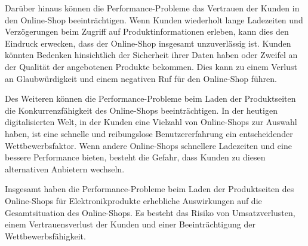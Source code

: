Darüber hinaus können die Performance-Probleme das Vertrauen der Kunden in den Online-Shop beeinträchtigen. Wenn Kunden wiederholt lange Ladezeiten und Verzögerungen beim Zugriff auf Produktinformationen erleben, kann dies den Eindruck erwecken, dass der Online-Shop insgesamt unzuverlässig ist. Kunden könnten Bedenken hinsichtlich der Sicherheit ihrer Daten haben oder Zweifel an der Qualität der angebotenen Produkte bekommen. Dies kann zu einem Verlust an Glaubwürdigkeit und einem negativen Ruf für den Online-Shop führen.

Des Weiteren können die Performance-Probleme beim Laden der Produktseiten die Konkurrenzfähigkeit des Online-Shops beeinträchtigen. In der heutigen digitalisierten Welt, in der Kunden eine Vielzahl von Online-Shops zur Auswahl haben, ist eine schnelle und reibungslose Benutzererfahrung ein entscheidender Wettbewerbsfaktor. Wenn andere Online-Shops schnellere Ladezeiten und eine bessere Performance bieten, besteht die Gefahr, dass Kunden zu diesen alternativen Anbietern wechseln.

Insgesamt haben die Performance-Probleme beim Laden der Produktseiten des Online-Shops für Elektronikprodukte erhebliche Auswirkungen auf die Gesamtsituation des Online-Shops. Es besteht das Risiko von Umsatzverlusten, einem Vertrauensverlust der Kunden und einer Beeinträchtigung der Wettbewerbsfähigkeit.